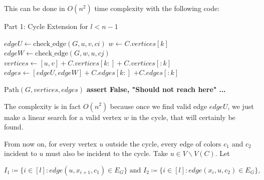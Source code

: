 This can be done in $O(n^2)$ time complexity with the following code:

\begin{algorithm}[H]
    \caption{Part 1: Cycle Extension for \( l < n - 1 \)}
    \begin{algorithmic}
            \For{$[ci, cj] \in [[c1, c2], [c2, c1]]$} 
                            \State $edgeU \gets \text{check\_edge}(G, u, v, ci)$
                                    \State $w \gets C.vertices[k]$
                                    \State $edgeW \gets \text{check\_edge}(G, w, u, cj)$
                                        \State $vertices \gets [u, v] + C.vertices[k:] + C.vertices[:k]$
                                        \State $edges \gets [edgeU, edgeW] + C.edges[k:]$
                                        \State \hspace{3em} $+ C.edges[:k]$
                                        
                                        \State \Return $\text{Path}(G, vertices, edges)$
                                    \EndIf
                                \EndFor
                                \State \textbf{assert False, "Should not reach here"}
                            \EndIf
                        \EndIf
                    \EndFor
                \EndFor
            \EndFor
            \State \textbf{...}
        \EndFunction
    \end{algorithmic}
\end{algorithm}

The complexity is in fact $O(n^2)$ because once we find valid edge $edgeU$, we 
just make a linear search for a valid vertex $w$ in the cycle, that will 
certainly be found.

From now on, for every vertex $u$ outside the cycle, every edge of colors $c_1$ and $c_2$ incident to 
$u$ must also be incident to the cycle. 
Take $u \in V \backslash V(C)$. Let 

$$
I_1 \coloneqq \{i \in [l]: edge(u, x_{i + 1}, c_1) \in E_G\} \text{ and } I_2 \coloneqq \{i \in [l]: edge(x_i, u, c_2) \in E_G\},
$$

